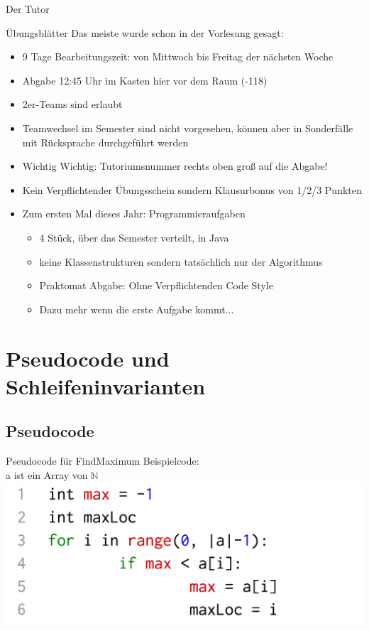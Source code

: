\documentclass[18pt]{beamer}
\begin{document}
\begin{frame}{Der Tutor}
	\begin{frame}{Übungsblätter}
		Das meiste wurde schon in der Vorlesung gesagt:
		\begin{itemize}
			\item 9 Tage Bearbeitungszeit: von Mittwoch bis Freitag der nächsten Woche
			\item Abgabe 12:45 Uhr im Kasten hier vor dem Raum (-118)
			\item 2er-Teams sind erlaubt
			\item Teamwechsel im Semester sind nicht vorgesehen, können aber in Sonderfälle mit Rücksprache durchgeführt werden
			\item Wichtig Wichtig: Tutoriumsnummer rechts oben groß auf die Abgabe!
			\item Kein Verpflichtender Übungsschein sondern Klausurbonus von 1/2/3 Punkten
			\item Zum ersten Mal dieses Jahr: Programmieraufgaben
			\begin{itemize}
				\item 4 Stück, über das Semester verteilt, in Java
				\item keine Klassenstrukturen sondern tatsächlich nur der Algorithmus
				\item Praktomat Abgabe: Ohne Verpflichtenden Code Style
				\item Dazu mehr wenn die erste Aufgabe kommt...
			\end{itemize}
		\end{itemize}		
	\end{frame}

\section{Pseudocode und Schleifeninvarianten}
	\subsection{Pseudocode}
	\begin{frame} {Pseudocode für FindMaximum} 
		Beispielcode:\\
		a ist ein Array von $\mathbb{N}$
		\includegraphics[align=center, scale=0.25]{pics/pseudocode01.png}		
	\end{frame} 


\end{frame}
\end{document}
